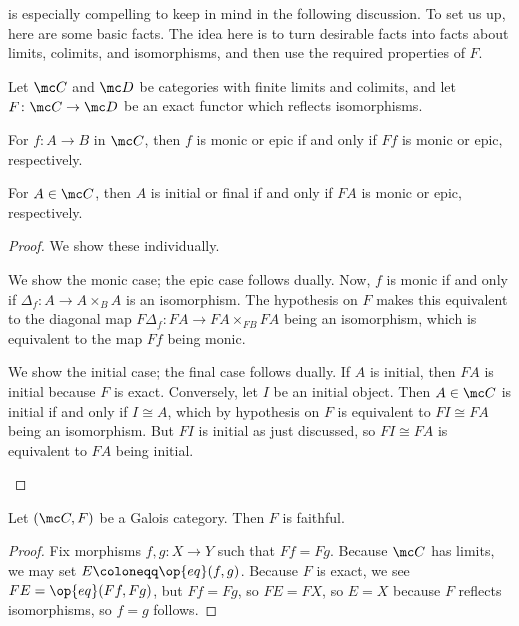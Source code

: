 \documentclass{amsart}
\begin{document}
 is especially compelling to keep in mind in the following discussion. To set us up, here are some basic facts. The idea here is to turn desirable facts into facts about limits, colimits, and isomorphisms, and then use the required properties of $F$.
\begin{lemma} \label{lem:dual-facts}
    Let $\mc C$ and $\mc D$ be categories with finite limits and colimits, and let $F\colon\mc C\to\mc D$ be an exact functor which reflects isomorphisms.
    \begin{listalph}
        \item For $f\colon A\to B$ in $\mc C$, then $f$ is monic or epic if and only if $Ff$ is monic or epic, respectively.
        \item For $A\in\mc C$, then $A$ is initial or final if and only if $FA$ is monic or epic, respectively.
    \end{listalph}
\end{lemma}
\begin{proof}
    We show these individually.
    \begin{listalph}
        \item We show the monic case; the epic case follows dually. Now, $f$ is monic if and only if $\Delta_f\colon A\to A\times_BA$ is an isomorphism. The hypothesis on $F$ makes this equivalent to the diagonal map $F\Delta_f\colon FA\to FA\times_{FB}FA$ being an isomorphism, which is equivalent to the map $Ff$ being monic.
        \item We show the initial case; the final case follows dually. If $A$ is initial, then $FA$ is initial because $F$ is exact. Conversely, let $I$ be an initial object. Then $A\in\mc C$ is initial if and only if $I\cong A$, which by hypothesis on $F$ is equivalent to $FI\cong FA$ being an isomorphism. But $FI$ is initial as just discussed, so $FI\cong FA$ is equivalent to $FA$ being initial.
        \qedhere
    \end{listalph}
\end{proof}
\begin{lemma} \label{lem:faithful}
    Let $(\mc C,F)$ be a Galois category. Then $F$ is faithful.
\end{lemma}
\begin{proof}
    Fix morphisms $f,g\colon X\to Y$ such that $Ff=Fg$. Because $\mc C$ has limits, we may set $E\coloneqq\op{eq}(f,g)$. Because $F$ is exact, we see $FE=\op{eq}(Ff,Fg)$, but $Ff=Fg$, so $FE=FX$, so $E=X$ because $F$ reflects isomorphisms, so $f=g$ follows.
\end{proof}
\end{document}
